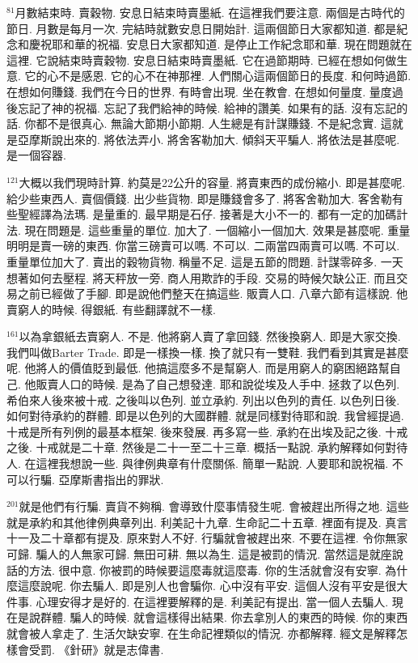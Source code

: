 \documentclass{book}
\begin{document}
$^{81}$月數結束時.
賣穀物.
安息日結束時賣墨紙.
在這裡我們要注意.
兩個是古時代的節日.
月數是每月一次.
完結時就數安息日開始計.
這兩個節日大家都知道.
都是紀念和慶祝耶和華的祝福.
安息日大家都知道.
是停止工作紀念耶和華.
現在問題就在這裡.
它說結束時賣穀物.
安息日結束時賣墨紙.
它在過節期時.
已經在想如何做生意.
它的心不是感恩.
它的心不在神那裡.
人們關心這兩個節日的長度.
和何時過節.
在想如何賺錢.
我們在今日的世界.
有時會出現.
坐在教會.
在想如何量度.
量度過後忘記了神的祝福.
忘記了我們給神的時候.
給神的讚美.
如果有的話.
沒有忘記的話.
你都不是很真心.
無論大節期小節期.
人生總是有計謀賺錢.
不是紀念實.
這就是亞摩斯說出來的.
將依法弄小.
將舍客勒加大.
傾斜天平騙人.
將依法是甚麼呢.
是一個容器.

$^{121}$大概以我們現時計算.
約莫是22公升的容量.
將賣東西的成份縮小.
即是甚麼呢.
給少些東西人.
賣個價錢.
出少些貨物.
即是賺錢會多了.
將客舍勒加大.
客舍勒有些聖經譯為法瑪.
是量重的.
最早期是石仔.
接著是大小不一的.
都有一定的加碼計法.
現在問題是.
這些重量的單位.
加大了.
一個縮小一個加大.
效果是甚麼呢.
重量明明是賣一磅的東西.
你當三磅賣可以嗎.
不可以.
二兩當四兩賣可以嗎.
不可以.
重量單位加大了.
賣出的穀物貨物.
稱量不足.
這是五節的問題.
計謀零碎多.
一天想著如何去壓程.
將天秤放一旁.
商人用欺詐的手段.
交易的時候欠缺公正.
而且交易之前已經做了手腳.
即是說他們整天在搞這些.
販賣人口.
八章六節有這樣說.
他賣窮人的時候.
得銀紙.
有些翻譯就不一樣.

$^{161}$以為拿銀紙去賣窮人.
不是.
他將窮人賣了拿回錢.
然後換窮人.
即是大家交換.
我們叫做Barter Trade.
即是一樣換一樣.
換了就只有一雙鞋.
我們看到其實是甚麼呢.
他將人的價值貶到最低.
他搞這麼多不是幫窮人.
而是用窮人的窮困絕路幫自己.
他販賣人口的時候.
是為了自己想發達.
耶和說從埃及人手中.
拯救了以色列.
希伯來人後來被十戒.
之後叫以色列.
並立承約.
列出以色列的責任.
以色列日後.
如何對待承約的群體.
即是以色列的大國群體.
就是同樣對待耶和說.
我曾經提過.
十戒是所有列例的最基本框架.
後來發展.
再多寫一些.
承約在出埃及記之後.
十戒之後.
十戒就是二十章.
然後是二十一至二十三章.
概括一點說.
承約解釋如何對待人.
在這裡我想說一些.
與律例典章有什麼關係.
簡單一點說.
人要耶和說祝福.
不可以行騙.
亞摩斯書指出的罪狀.

$^{201}$就是他們有行騙.
賣貨不夠稱.
會導致什麼事情發生呢.
會被趕出所得之地.
這些就是承約和其他律例典章列出.
利美記十九章.
生命記二十五章.
裡面有提及.
真言十一及二十章都有提及.
原來對人不好.
行騙就會被趕出來.
不要在這裡.
令你無家可歸.
騙人的人無家可歸.
無田可耕.
無以為生.
這是被罰的情況.
當然這是就座說話的方法.
很中意.
你被罰的時候要這麼毒就這麼毒.
你的生活就會沒有安寧.
為什麼這麼說呢.
你去騙人.
即是別人也會騙你.
心中沒有平安.
這個人沒有平安是很大件事.
心理安得才是好的.
在這裡要解釋的是.
利美記有提出.
當一個人去騙人.
現在是說群體.
騙人的時候.
就會這樣得出結果.
你去拿別人的東西的時候.
你的東西就會被人拿走了.
生活欠缺安寧.
在生命記裡類似的情況.
亦都解釋.
經文是解釋怎樣會受罰.
《針研》就是志偉書.
\end{document}
